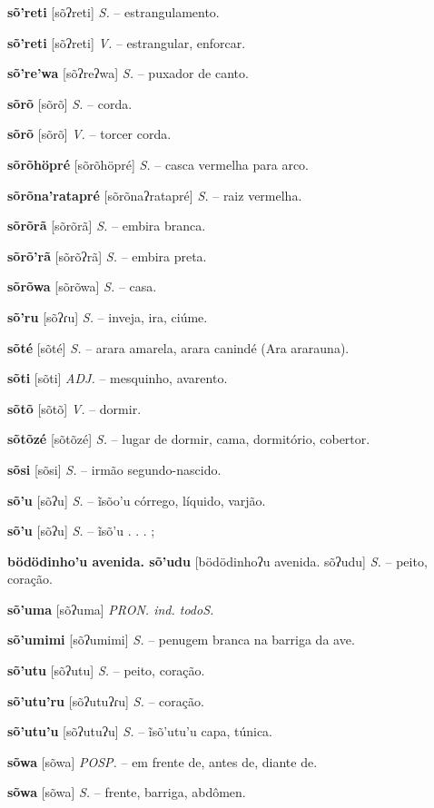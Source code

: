 \textbf{sõ'reti} [sõʔreti] \textit{S.} -- estrangulamento.

\textbf{sõ'reti} [sõʔreti] \textit{V.} -- estrangular, enforcar.

\textbf{sõ're'wa} [sõʔreʔwa] \textit{S.} -- puxador de canto.

\textbf{sõrõ} [sõrõ] \textit{S.} -- corda.

\textbf{sõrõ} [sõrõ] \textit{V.} -- torcer corda.

\textbf{sõrõhöpré} [sõrõhöpré] \textit{S.} -- casca vermelha para arco.

\textbf{sõrõna'ratapré} [sõrõnaʔratapré] \textit{S.} -- raiz vermelha.

\textbf{sõrõrã} [sõrõrã] \textit{S.} -- embira branca.

\textbf{sõrõ'rã} [sõrõʔrã] \textit{S.} -- embira preta.

\textbf{sõrõwa} [sõrõwa] \textit{S.} -- casa.

\textbf{sõ'ru} [sõʔɾu] \textit{S.} -- inveja, ira, ciúme.

\textbf{sõté} [sõté] \textit{S.} -- arara amarela, arara canindé (Ara ararauna).

\textbf{sõti} [sõti] \textit{ADJ.} -- mesquinho, avarento.

\textbf{sõtõ} [sõtõ] \textit{V.} -- dormir.

\textbf{sõtõzé} [sõtõzé] \textit{S.} -- lugar de dormir, cama, dormitório, cobertor.

\textbf{sõsi} [sõsi] \textit{S.} -- irmão segundo-nascido.

\textbf{sõ'u} [sõʔu] \textit{S.} -- ĩsõo'u córrego, líquido, varjão.

\textbf{sõ'u} [sõʔu] \textit{S.} -- ĩsõ'u . . . ;

\textbf{bödödinho'u avenida. sõ'udu} [bödödinhoʔu avenida. sõʔudu] \textit{S.} -- peito, coração.

\textbf{sõ'uma} [sõʔuma] \textit{PRON. ind. todoS.}

\textbf{sõ'umimi} [sõʔumimi] \textit{S.} -- penugem branca na barriga da ave.

\textbf{sõ'utu} [sõʔutu] \textit{S.} -- peito, coração.

\textbf{sõ'utu'ru} [sõʔutuʔɾu] \textit{S.} -- coração.

\textbf{sõ'utu'u} [sõʔutuʔu] \textit{S.} -- ĩsõ'utu'u capa, túnica.

\textbf{sõwa} [sõwa] \textit{POSP.} -- em frente de, antes de, diante de.

\textbf{sõwa} [sõwa] \textit{S.} -- frente, barriga, abdômen.

